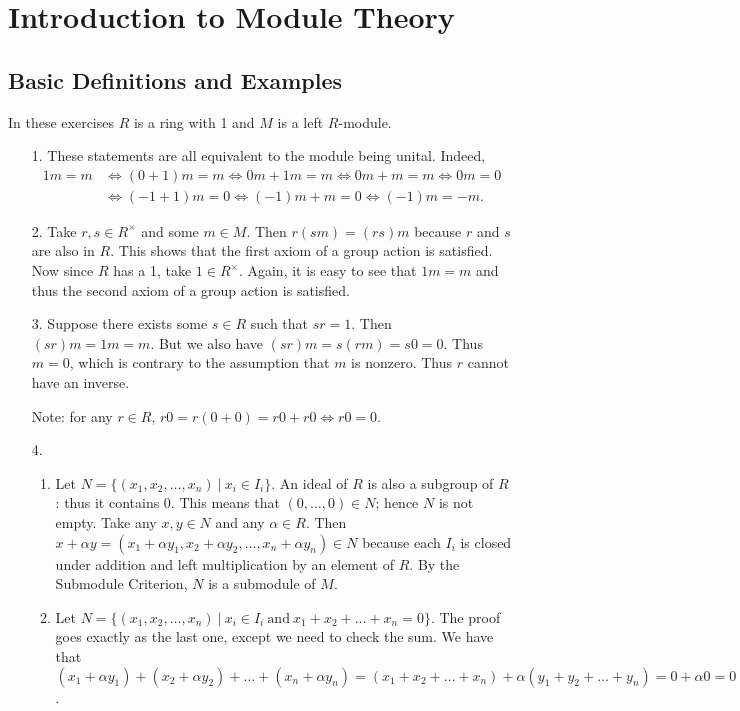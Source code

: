 \documentclass{report}
\begin{document}
\chapter{Introduction to Module Theory}

\section{Basic Definitions and Examples}

In these exercises $R$ is a ring with 1 and $M$ is a left $R$-module.

\begin{enumerate}
\item[1.]
These statements are all equivalent to the module being unital. Indeed,
\begin{align*}
1m=m &\iff (0+1)m=m \iff 0m+1m=m \iff 0m+m=m \iff 0m=0 \\
&\iff (-1+1)m=0 \iff (-1)m+m=0 \iff (-1)m=-m.
\end{align*}

\item[2.]
Take $r,s\in R^{\times}$ and some $m\in M$. Then $r(sm) = (rs)m$ because $r$ and $s$ are also in $R$. This shows that the first axiom of a group action is satisfied. Now since $R$ has a 1, take $1\in R^{\times}$. Again, it is easy to see that $1m=m$ and thus the second axiom of a group action is satisfied.

\item[3.]
Suppose there exists some $s\in R$ such that $sr=1$. Then $(sr)m=1m=m$. But we also have $(sr)m=s(rm)=s0=0$. Thus $m=0$, which is contrary to the assumption that $m$ is nonzero. Thus $r$ cannot have an inverse.

Note: for any $r\in R$, $r0 = r(0+0) = r0+r0 \iff r0=0$.

\item[4.]
\begin{enumerate}
\item
Let $N=\{(x_1,x_2,\dots,x_n)\ |\ x_i\in I_i\}$. An ideal of $R$ is also a subgroup of $R$: thus it contains $0$. This means that $(0,\dots,0)\in N$; hence $N$ is not empty. Take any $x,y\in N$ and any $\alpha\in R$. Then $x+\alpha y = (x_1+\alpha y_1,x_2+\alpha y_2,\dots,x_n+\alpha y_n)\in N$ because each $I_i$ is closed under addition and left multiplication by an element of $R$. By the Submodule Criterion, $N$ is a submodule of $M$.
\item
Let $N=\{(x_1,x_2,\dots,x_n)\ |\ x_i\in I_i\ \text{and}\ x_1+x_2+\dots+x_n=0\}$. The proof goes exactly as the last one, except we need to check the sum. We have that $(x_1+\alpha y_1)+(x_2+\alpha y_2)+\dots +(x_n+\alpha y_n) = (x_1+x_2+\dots+x_n)+\alpha(y_1+y_2+\dots+y_n) = 0+\alpha0 = 0$.
\end{enumerate}


\end{enumerate}
\end{document}
